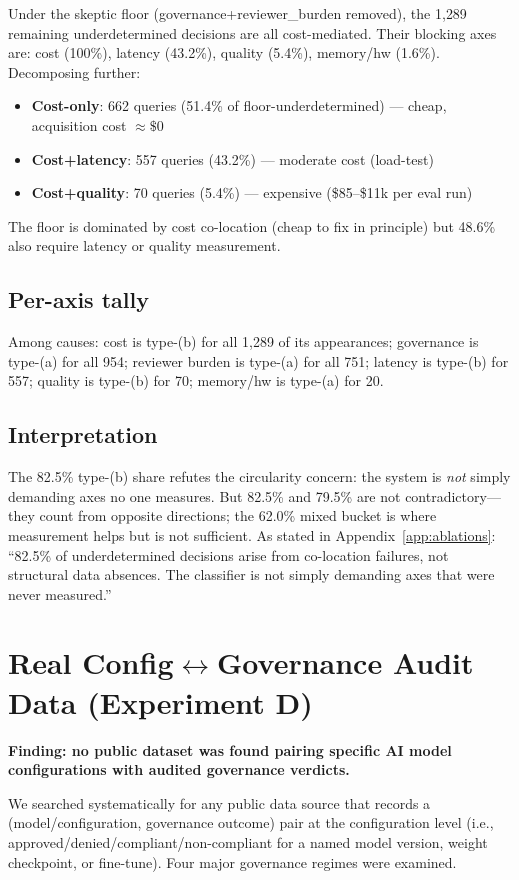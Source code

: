\documentclass{article} %
\begin{document}
Under the skeptic floor (governance+reviewer\_burden removed), the 1{,}289 remaining underdetermined decisions are all cost-mediated. Their blocking axes are: cost (100\%), latency (43.2\%), quality (5.4\%), memory/hw (1.6\%). Decomposing further:
\begin{itemize}
\item \textbf{Cost-only}: 662 queries (51.4\% of floor-underdetermined) --- cheap, acquisition cost $\approx\$0$
\item \textbf{Cost+latency}: 557 queries (43.2\%) --- moderate cost (load-test)
\item \textbf{Cost+quality}: 70 queries (5.4\%) --- expensive (\$85--\$11k per eval run)
\end{itemize}
The floor is dominated by cost co-location (cheap to fix in principle) but 48.6\% also require latency or quality measurement.

\subsection*{Per-axis tally}
Among causes: cost is type-(b) for all 1{,}289 of its appearances; governance is type-(a) for all 954; reviewer burden is type-(a) for all 751; latency is type-(b) for 557; quality is type-(b) for 70; memory/hw is type-(a) for 20.

\subsection*{Interpretation}
The 82.5\% type-(b) share refutes the circularity concern: the system is \emph{not} simply demanding axes no one measures. But 82.5\% and 79.5\% are not contradictory---they count from opposite directions; the 62.0\% mixed bucket is where measurement helps but is not sufficient.
As stated in Appendix~\ref{app:ablations}: ``82.5\% of underdetermined decisions arise from co-location failures, not structural data absences. The classifier is not simply demanding axes that were never measured.''

\section{Real Config$\leftrightarrow$Governance Audit Data (Experiment D)}
\label{app:audit_data}

\textbf{Finding: no public dataset was found pairing specific AI model configurations with audited governance verdicts.}

We searched systematically for any public data source that records a (model/configuration, governance outcome) pair at the configuration level (i.e., approved/denied/compliant/non-compliant for a named model version, weight checkpoint, or fine-tune).
Four major governance regimes were examined.
\end{document}

